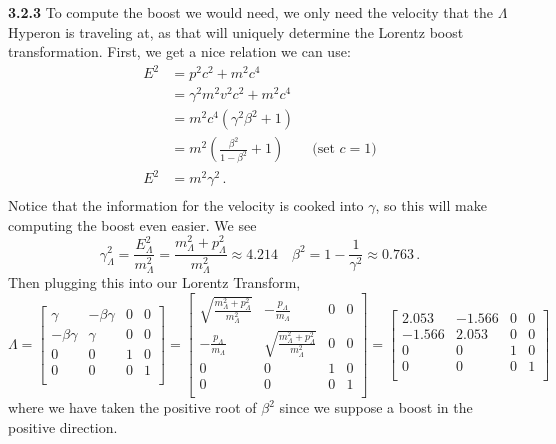 \documentclass[10pt]{article}
\begin{document}
\textbf{3.2.3} To compute the boost we would need, we only need the velocity that the $\Lambda$ Hyperon is traveling at, as that will uniquely determine the Lorentz boost transformation. First, we get a nice relation we can use:
\begin{equation*}
  \begin{split}
    E^{2} & = p^{2}c^{2} + m^{2}c^{4} \\
    & = \gamma^{2}m^{2}v^{2}c^{2} + m^{2}c^{4} \\
    & = m^{2}c^{4}\left(\gamma^{2}\beta^{2} + 1\right) \\
    & = m^{2}\left(\frac{\beta^{2}}{1- \beta^{2}} + 1\right)  \quad \quad \text{(set $c=1$)} \\
    E^{2} & = m^{2}\gamma^{2} \, .\\
  \end{split}
\end{equation*}
Notice that the information for the velocity is cooked into $\gamma$, so this will make computing the boost even easier. We see
\[ \gamma^{2}_{\Lambda} = \frac{E_{\Lambda}^{2}}{m_{\Lambda}^{2}} = \frac{m_{\Lambda}^{2} + p_{\Lambda}^{2}}{m_{\Lambda}^{2}} \approx 4.214 \quad \beta^{2} = 1-\frac{1}{\gamma^{2}} \approx 0.763\, .\]
Then plugging this into our Lorentz Transform,
\[
\Lambda = 
\begin{bmatrix}
  \gamma & -\beta \gamma & 0  & 0 \\
  - \beta \gamma & \gamma & 0 & 0 \\
  0 & 0 & 1 & 0 \\
  0 & 0 & 0 & 1 \\
\end{bmatrix}
=
\begin{bmatrix}
  \sqrt{\frac{m_{\Lambda}^{2} + p_{\Lambda}^{2}}{m_{\Lambda}^{2}}} & -\frac{p_{\Lambda}}{m_{\Lambda}} & 0  & 0 \\
  - \frac{p_{\Lambda}}{m_{\Lambda}} &  \sqrt{\frac{m_{\Lambda}^{2} + p_{\Lambda}^{2}}{m_{\Lambda}^{2}}} & 0 & 0 \\
  0 & 0 & 1 & 0 \\
  0 & 0 & 0 & 1 \\
\end{bmatrix}
= 
\begin{bmatrix}
  2.053 & -1.566 & 0 & 0 \\
  -1.566 & 2.053 & 0 & 0 \\
  0 & 0 & 1 & 0 \\
  0 & 0 & 0 & 1 \\
\end{bmatrix}
\]
where we have taken the positive root of $\beta^{2}$ since we suppose a boost in the positive direction.
\end{document}
